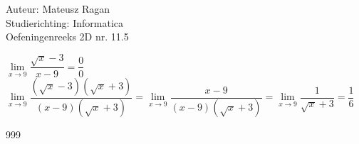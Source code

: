 \documentclass[a4paper]{article}
\begin{document}
\noindent \large Auteur: Mateusz Ragan \\
\noindent \large Studierichting: Informatica\\
\noindent \large Oefeningenreeks 2D nr. 11.5\\

\medskip

\normalsize

$\lim\limits_{x \rightarrow 9} \dfrac{\sqrt{x}-3}{x-9} = \dfrac{0}{0}$\\

$\lim\limits_{x \rightarrow 9} \dfrac{(\sqrt{x}-3)(\sqrt{x}+3)}{(x-9)(\sqrt{x}+3)} = \lim\limits_{x \rightarrow 9} \dfrac{x-9}{(x-9)(\sqrt{x}+3)} = \lim\limits_{x \rightarrow 9} \dfrac{1}{\sqrt{x} + 3} = \dfrac{1}{6}$\\



\begin{thebibliography}{999}
\end{thebibliography}
\end{document}
